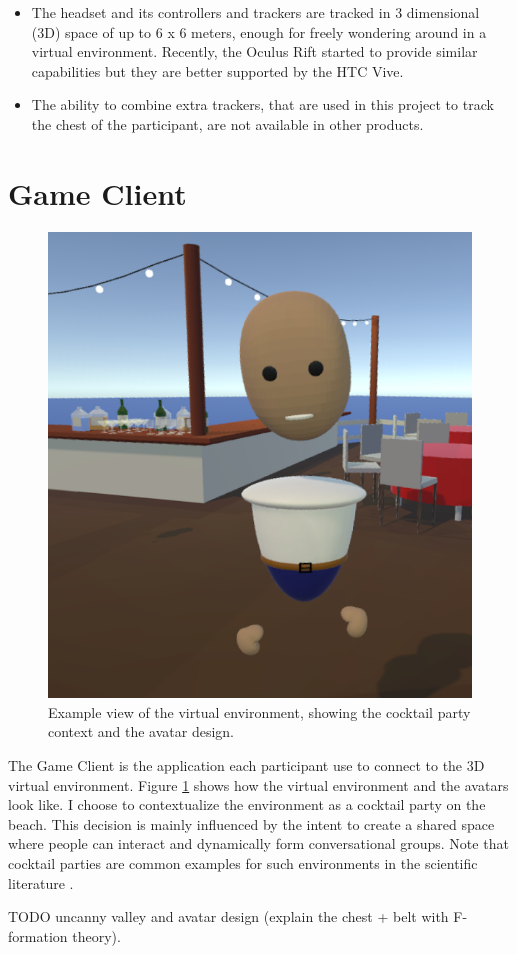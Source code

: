 \documentclass[]{simple-thesis}
\begin{document}
\begin{itemize}
  \item The headset and its controllers and trackers are tracked in 3 dimensional (3D) space of up to 6 x 6 meters, enough for freely wondering around in a virtual environment. Recently, the Oculus Rift started to provide similar capabilities but they are better supported by the HTC Vive.
  \item The ability to combine extra trackers, that are used in this project to track the chest of the participant, are not available in other products.
\end{itemize}

\section{Game Client}

\begin{figure}
  \centering
  \includegraphics[width=.5\textwidth]{../graphics/environment_demo.png}
  \caption{Example view of the virtual environment, showing the cocktail party context and the avatar design.}
  \label{fig:system:environment_demo}
\end{figure}

The Game Client is the application each participant use to connect to the 3D virtual environment.
Figure \ref{fig:system:environment_demo} shows how the virtual environment and the avatars look like.
I choose to contextualize the environment as a cocktail party on the beach.
This decision is mainly influenced by the intent to create a shared space where people can interact and dynamically form conversational groups.
Note that cocktail parties are common examples for such environments in the scientific literature \citep{Setti2015}.

TODO uncanny valley and avatar design (explain the chest + belt with F-formation theory).
\end{document}
